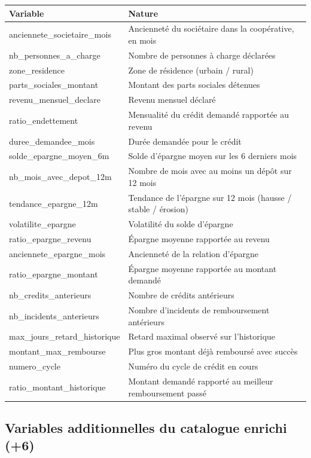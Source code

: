 \documentclass[11pt,a4paper]{article}
\begin{document}
\begin{longtable}{L{6cm}L{9cm}}
\toprule
\textbf{Variable} & \textbf{Nature} \\
\midrule
\endhead
anciennete\_societaire\_mois & Ancienneté du sociétaire dans la coopérative, en mois \\
nb\_personnes\_a\_charge & Nombre de personnes à charge déclarées \\
zone\_residence & Zone de résidence (urbain / rural) \\
parts\_sociales\_montant & Montant des parts sociales détenues \\
revenu\_mensuel\_declare & Revenu mensuel déclaré \\
ratio\_endettement & Mensualité du crédit demandé rapportée au revenu \\
duree\_demandee\_mois & Durée demandée pour le crédit \\
solde\_epargne\_moyen\_6m & Solde d'épargne moyen sur les 6 derniers mois \\
nb\_mois\_avec\_depot\_12m & Nombre de mois avec au moins un dépôt sur 12 mois \\
tendance\_epargne\_12m & Tendance de l'épargne sur 12 mois (hausse / stable / érosion) \\
volatilite\_epargne & Volatilité du solde d'épargne \\
ratio\_epargne\_revenu & Épargne moyenne rapportée au revenu \\
anciennete\_epargne\_mois & Ancienneté de la relation d'épargne \\
ratio\_epargne\_montant & Épargne moyenne rapportée au montant demandé \\
nb\_credits\_anterieurs & Nombre de crédits antérieurs \\
nb\_incidents\_anterieurs & Nombre d'incidents de remboursement antérieurs \\
max\_jours\_retard\_historique & Retard maximal observé sur l'historique \\
montant\_max\_rembourse & Plus gros montant déjà remboursé avec succès \\
numero\_cycle & Numéro du cycle de crédit en cours \\
ratio\_montant\_historique & Montant demandé rapporté au meilleur remboursement passé \\
\bottomrule
\end{longtable}

\subsection{Variables additionnelles du catalogue enrichi (+6)}
\end{document}
